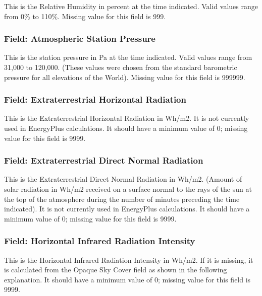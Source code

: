 This is the Relative Humidity in percent at the time indicated. Valid values range from 0\% to 110\%. Missing value for this field is 999.

\subsubsection{Field: Atmospheric Station Pressure}\label{field-atmospheric-station-pressure}

This is the station pressure in Pa at the time indicated. Valid values range from 31,000 to 120,000. (These values were chosen from the standard barometric pressure for all elevations of the World). Missing value for this field is 999999.

\subsubsection{Field: Extraterrestrial Horizontal Radiation}\label{field-extraterrestrial-horizontal-radiation}

This is the Extraterrestrial Horizontal Radiation in Wh/m2. It is not currently used in EnergyPlus calculations. It should have a minimum value of 0; missing value for this field is 9999.

\subsubsection{Field: Extraterrestrial Direct Normal Radiation}\label{field-extraterrestrial-direct-normal-radiation}

This is the Extraterrestrial Direct Normal Radiation in Wh/m2. (Amount of solar radiation in Wh/m2 received on a surface normal to the rays of the sun at the top of the atmosphere during the number of minutes preceding the time indicated). It is not currently used in EnergyPlus calculations. It should have a minimum value of 0; missing value for this field is 9999.

\subsubsection{Field: Horizontal Infrared Radiation Intensity}\label{field-horizontal-infrared-radiation-intensity}

This is the Horizontal Infrared Radiation Intensity in Wh/m2. If it is missing, it is calculated from the Opaque Sky Cover field as shown in the following explanation. It should have a minimum value of 0; missing value for this field is 9999.

